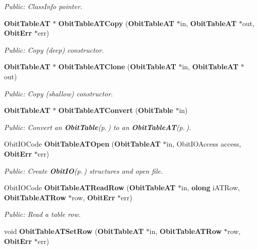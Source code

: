 \begin{CompactItemize}
\begin{CompactList}\small\item\em Public: Class\-Info pointer. \item\end{CompactList}\item 
{\bf Obit\-Table\-AT} $\ast$ {\bf Obit\-Table\-ATCopy} ({\bf Obit\-Table\-AT} $\ast$in, {\bf Obit\-Table\-AT} $\ast$out, {\bf Obit\-Err} $\ast$err)
\begin{CompactList}\small\item\em Public: Copy (deep) constructor. \item\end{CompactList}\item 
{\bf Obit\-Table\-AT} $\ast$ {\bf Obit\-Table\-ATClone} ({\bf Obit\-Table\-AT} $\ast$in, {\bf Obit\-Table\-AT} $\ast$out)
\begin{CompactList}\small\item\em Public: Copy (shallow) constructor. \item\end{CompactList}\item 
{\bf Obit\-Table\-AT} $\ast$ {\bf Obit\-Table\-ATConvert} ({\bf Obit\-Table} $\ast$in)
\begin{CompactList}\small\item\em Public: Convert an {\bf Obit\-Table}{\rm (p.\,\pageref{structObitTable})} to an {\bf Obit\-Table\-AT}{\rm (p.\,\pageref{structObitTableAT})}. \item\end{CompactList}\item 
Obit\-IOCode {\bf Obit\-Table\-ATOpen} ({\bf Obit\-Table\-AT} $\ast$in, Obit\-IOAccess access, {\bf Obit\-Err} $\ast$err)
\begin{CompactList}\small\item\em Public: Create {\bf Obit\-IO}{\rm (p.\,\pageref{structObitIO})} structures and open file. \item\end{CompactList}\item 
Obit\-IOCode {\bf Obit\-Table\-ATRead\-Row} ({\bf Obit\-Table\-AT} $\ast$in, {\bf olong} i\-ATRow, {\bf Obit\-Table\-ATRow} $\ast$row, {\bf Obit\-Err} $\ast$err)
\begin{CompactList}\small\item\em Public: Read a table row. \item\end{CompactList}\item 
void {\bf Obit\-Table\-ATSet\-Row} ({\bf Obit\-Table\-AT} $\ast$in, {\bf Obit\-Table\-ATRow} $\ast$row, {\bf Obit\-Err} $\ast$err)

\end{CompactItemize}
